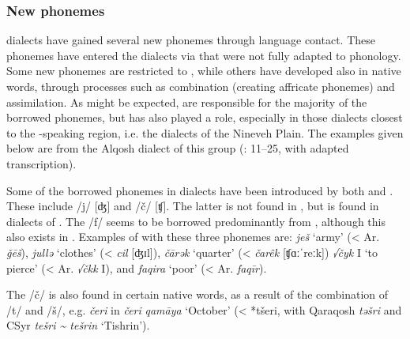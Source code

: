 \documentclass[output=paper]{langsci/langscibook}
\begin{document}
\subsubsection{New phonemes}

 dialects have gained several new phonemes through language contact. These phonemes have entered the dialects via  that were not fully adapted to  phonology. Some new phonemes are restricted to , while others have developed also in native words, through processes such as combination (creating affricate phonemes) and assimilation. As might be expected,   are responsible for the majority of the borrowed phonemes, but  has also played a role, especially in those dialects closest to the -speaking region, i.e. the  dialects of the Nineveh Plain. The examples given below are from the  Alqosh dialect of this group (\citealt{Coghill2004}: 11–25, with adapted transcription).

Some of the borrowed phonemes in  dialects have been introduced by both  and  . These include /j/ [ʤ] and /č/ [ʧ]. The latter is not found in  , but is found in  dialects of . The  /f/ seems to be borrowed predominantly from , although this  also exists in . Examples of  with these three phonemes are: \textit{ješ} ‘army’ (<  Ar. \textit{ǧēš}), \textit{jullə} ‘clothes’ (<  \textit{cil} [ʤɪl]), \textit{čārək} ‘quarter’ (<  \textit{čarêk} [ʧɑːˈreːk]) \textit{√čyk} I ‘to pierce’ (<  Ar. \textit{√čkk} I), and \textit{faqira} ‘poor’ (< Ar. \textit{faqīr}).

The  /č/ is also found in certain native  words, as a result of the combination of /t/ and /š/, e.g. \textit{čeri} in \textit{čeri} \textit{qamāya} ‘October’ (< *tšeri,  with  Qaraqosh \textit{təšri} and CSyr \textit{tešri {\textasciitilde} tešrin} ‘Tishrin’).
\end{document}
